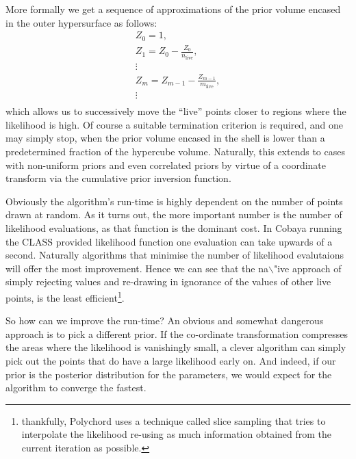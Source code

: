 \documentclass[usenatbib]{mnras}
\begin{document}
More formally we get a sequence of approximations of the prior
volume encased in the outer hypersurface as follows:
\begin{eqnarray}
  Z_{0} = 1,\\
  Z_{1} = Z_{0} - \frac{Z_{0}}{n_\text{live}},\\
  \vdots\\
  Z_{m} = Z_{m-1} - \frac{Z_{m-1}}{m_\text{live}},\\
  \vdots\\
\end{eqnarray}
which allows us to successively move the ``live'' points closer to
regions where the likelihood is high. Of course a suitable
termination criterion is required, and one may simply stop, when
the prior volume encased in the shell is lower than a predetermined
fraction of the hypercube volume. Naturally, this extends to cases
with non-uniform priors and even correlated priors by virtue of a
coordinate transform via the cumulative prior inversion function.

Obviously the algorithm's run-time is highly dependent on the
number of points drawn at random. As it turns out, the more
important number is the number of likelihood evaluations, as that
function is the dominant cost. In Cobaya running the CLASS provided
likelihood function one evaluation can take upwards of a
second. Naturally algorithms that minimise the number of likelihood
evalutaions will offer the most improvement. Hence we can see that
the na$\backslash$"ive approach of simply rejecting values and re-drawing in
ignorance of the values of other live points, is the least
efficient\footnote{thankfully, Polychord uses a technique called slice   sampling that tries to interpolate the likelihood re-using as much  information obtained from the current iteration as possible.}.

So how can we improve the run-time? An obvious and somewhat
dangerous approach is to pick a different prior. If the co-ordinate
transformation compresses the areas where the likelihood is
vanishingly small, a clever algorithm can simply pick out the
points that do have a large likelihood early on. And indeed, if our
prior is the posterior distribution for the parameters, we would
expect for the algorithm to converge the fastest. 
\end{document}
